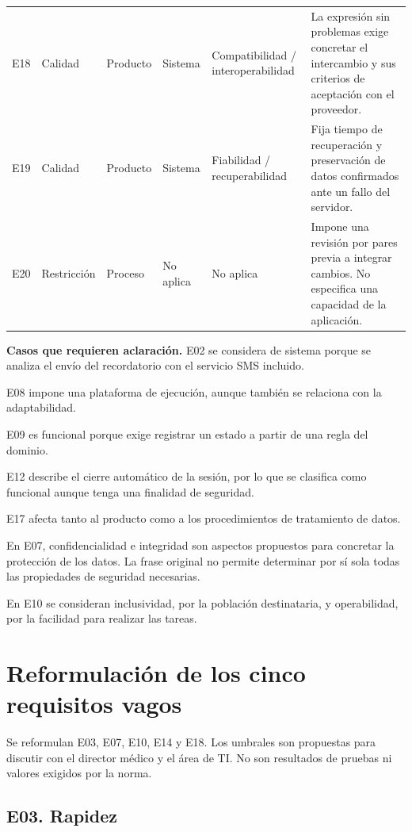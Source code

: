 \documentclass[11pt,a4paper]{article}
\begin{document}
{\begin{longtable}{
    @{}
    P{0.65cm}
    P{1.7cm}
    P{1.7cm}
    P{1.8cm}
    P{2.7cm}
    P{5.6cm}
    @{}
}
E18 &
Calidad &
Producto &
Sistema &
Compatibilidad / interoperabilidad &
La expresión sin problemas exige concretar el intercambio y
sus criterios de aceptación con el proveedor.
\\[4pt]

E19 &
Calidad &
Producto &
Sistema &
Fiabilidad / recuperabilidad &
Fija tiempo de recuperación y preservación de datos confirmados
ante un fallo del servidor.
\\[4pt]

E20 &
Restricción &
Proceso &
No aplica &
No aplica &
Impone una revisión por pares previa a integrar cambios.
No especifica una capacidad de la aplicación.
\\[4pt]

\end{longtable}
}

\textbf{Casos que requieren aclaración.}
E02 se considera de sistema porque se analiza el envío del
recordatorio con el servicio SMS incluido.

E08 impone una plataforma de ejecución, aunque también se
relaciona con la adaptabilidad.

E09 es funcional porque exige registrar un estado a partir de una
regla del dominio.

E12 describe el cierre automático de la sesión, por lo que se
clasifica como funcional aunque tenga una finalidad de seguridad.

E17 afecta tanto al producto como a los procedimientos de
tratamiento de datos.

En E07, confidencialidad e integridad son aspectos propuestos para
concretar la protección de los datos. La frase original no permite
determinar por sí sola todas las propiedades de seguridad necesarias.

En E10 se consideran inclusividad, por la población destinataria,
y operabilidad, por la facilidad para realizar las tareas.

\section{Reformulación de los cinco requisitos vagos}

Se reformulan E03, E07, E10, E14 y E18. Los umbrales son propuestas
para discutir con el director médico y el área de TI.
No son resultados de pruebas ni valores exigidos por la norma.

\subsection{E03. Rapidez}
\end{document}
